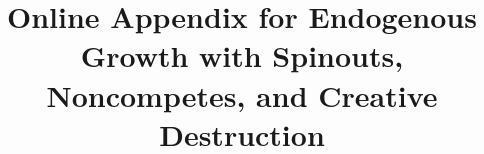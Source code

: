 \documentclass[ecta,nameyear,draft]{econsocart}
\theoremstyle{plain}
\theoremstyle{remark}
\begin{document}
\begin{frontmatter}

\title{Online Appendix for Endogenous Growth with Spinouts, Noncompetes, and Creative Destruction}

\begin{aug}
%
%
%
\address[id=add1]{%
\orgname{}}

\address[id=add11]{%
,
}

\address[id=add2]{%
,
}
\end{aug}

%


\end{frontmatter}
\end{document}
